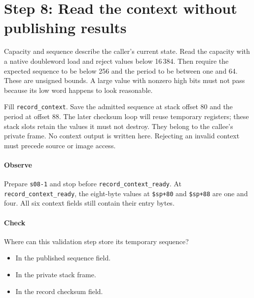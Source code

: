 \section{Step 8: Read the context without publishing results}
Capacity and sequence describe the caller's current state. Read the capacity
with a native doubleword load and reject values below 16\,384. Then require the
expected sequence to be below 256 and the period to be between one and 64. These
are unsigned bounds. A large value with nonzero high bits must not pass because
its low word happens to look reasonable.

Fill \texttt{record\_context}. Save the admitted sequence at stack offset 80 and
the period at offset 88. The later checksum loop will reuse temporary registers;
these stack slots retain the values it must not destroy. They belong to the
callee's private frame. No context output is written here. Rejecting an invalid
context must precede source or image access.

\paragraph{Observe} Prepare \texttt{s08-1} and stop before
\texttt{record\_context\_ready}. At \texttt{record\_context\_ready}, the eight-byte values at
\texttt{\$sp+80} and \texttt{\$sp+88} are one and four. All six context
fields still contain their entry bytes.

\paragraph{Check} Where can this validation step store its temporary sequence?
\begin{itemize}
  \item[A.] In the published sequence field.
  \item[B.] In the private stack frame.
  \item[C.] In the record checksum field.
\end{itemize}
